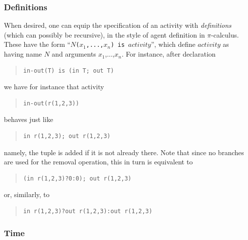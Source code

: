 \documentclass[12pt,a4paper,twoside,openright]{book}
\begin{document}
\subsubsection{Definitions}

When desired, one can equip the specification of an activity with \emph{definitions} (which can possibly be recursive), in the style of agent definition in $\pi$-calculus.
%
These have the form ``\texttt{$N$($x_1$,...,$x_n$) is $\mathit{activity}$}'', which define $\mathit{activity}$ as having name $N$ and arguments  $x_1$,$\ldots$,$x_n$.
%
For instance, after declaration
%
{\begin{quote}
\begin{verbatim}
in-out(T) is (in T; out T)
\end{verbatim}\end{quote}
}
\noindent we have for instance that activity
{\begin{quote}
\begin{verbatim}
in-out(r(1,2,3))
\end{verbatim}\end{quote}
}
\noindent
behaves just like 
{\begin{quote}
\begin{verbatim}
in r(1,2,3); out r(1,2,3)
\end{verbatim}\end{quote}
}
\noindent
namely, the tuple is added if it is not already there.
%
Note that since no branches are used for the removal operation, this in turn is equivalent to
{\begin{quote}
\begin{verbatim}
(in r(1,2,3)?0:0); out r(1,2,3)
\end{verbatim}\end{quote}
}
\noindent
or, similarly, to 
{\begin{quote}
\begin{verbatim}
in r(1,2,3)?out r(1,2,3):out r(1,2,3)
\end{verbatim}\end{quote}
}

\subsubsection{Time}
\end{document}
